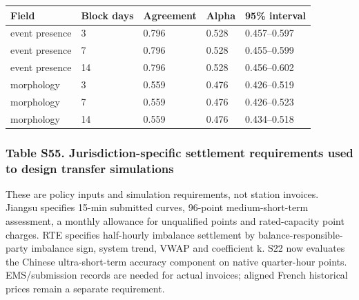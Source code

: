 \documentclass[a4paper,11pt]{article}
\newcounter{none}
\begin{document}
{\def\LTcaptype{none} %
\begin{longtable}[]{@{}lllll@{}}
\toprule\noalign{}
Field & Block days & Agreement & Alpha & 95\% interval \\
\midrule\noalign{}
\endhead
\bottomrule\noalign{}
\endlastfoot
event presence & 3 & 0.796 & 0.528 & 0.457--0.597 \\
event presence & 7 & 0.796 & 0.528 & 0.455--0.599 \\
event presence & 14 & 0.796 & 0.528 & 0.456--0.602 \\
morphology & 3 & 0.559 & 0.476 & 0.426--0.519 \\
morphology & 7 & 0.559 & 0.476 & 0.426--0.523 \\
morphology & 14 & 0.559 & 0.476 & 0.434--0.518 \\
\end{longtable}
}

\subsubsection{Table S55. Jurisdiction-specific settlement requirements used to design transfer simulations}\label{table-s55.-jurisdiction-specific-settlement-requirements-used-to-design-transfer-simulations}

These are policy inputs and simulation requirements, not station invoices. Jiangsu specifies 15-min submitted curves, 96-point medium-short-term assessment, a monthly allowance for unqualified points and rated-capacity point charges. RTE specifies half-hourly imbalance settlement by balance-responsible-party imbalance sign, system trend, VWAP and coefficient k. S22 now evaluates the Chinese ultra-short-term accuracy component on native quarter-hour points. EMS/submission records are needed for actual invoices; aligned French historical prices remain a separate requirement.
\end{document}
